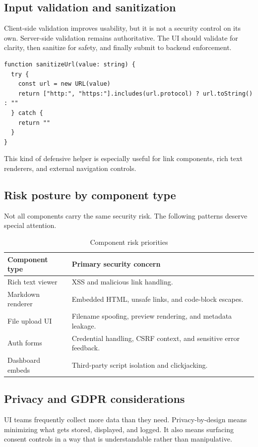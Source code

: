 \subsection{Input validation and sanitization}
Client-side validation improves usability, but it is not a security control on its own. Server-side validation remains authoritative. The UI should validate for clarity, then sanitize for safety, and finally submit to backend enforcement.

\begin{verbatim}
function sanitizeUrl(value: string) {
  try {
    const url = new URL(value)
    return ["http:", "https:"].includes(url.protocol) ? url.toString() : ""
  } catch {
    return ""
  }
}
\end{verbatim}

This kind of defensive helper is especially useful for link components, rich text renderers, and external navigation controls.

\subsection{Risk posture by component type}
Not all components carry the same security risk. The following patterns deserve special attention.

\begin{table}[htbp]
  \centering
  \caption{Component risk priorities}
  \begin{tabularx}{\textwidth}{@{}p{}X@{}}
    \toprule
    \textbf{Component type} & \textbf{Primary security concern} \\
    \midrule
    Rich text viewer & XSS and malicious link handling. \\
    Markdown renderer & Embedded HTML, unsafe links, and code-block escapes. \\
    File upload UI & Filename spoofing, preview rendering, and metadata leakage. \\
    Auth forms & Credential handling, CSRF context, and sensitive error feedback. \\
    Dashboard embeds & Third-party script isolation and clickjacking. \\
    \bottomrule
  \end{tabularx}
\end{table}

\subsection{Privacy and GDPR considerations}
UI teams frequently collect more data than they need. Privacy-by-design means minimizing what gets stored, displayed, and logged. It also means surfacing consent controls in a way that is understandable rather than manipulative.

